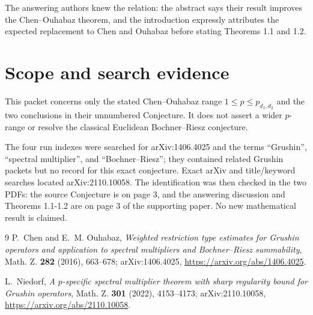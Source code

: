 \documentclass[11pt]{article}
\newcommand{\pd}{p_{d_1,d_2}}
\begin{document}
The answering authors knew the relation: the abstract says their result
improves the Chen--Ouhabaz theorem, and the introduction expressly attributes
the expected replacement to Chen and Ouhabaz before stating Theorems 1.1 and
1.2.

\section*{Scope and search evidence}

This packet concerns only the stated Chen--Ouhabaz range
$1\leq p\leq\pd$ and the two conclusions in their unnumbered Conjecture. It
does not assert a wider $p$-range or resolve the classical Euclidean
Bochner--Riesz conjecture.

The four run indexes were searched for arXiv:1406.4025 and the terms
``Grushin'', ``spectral multiplier'', and ``Bochner--Riesz''; they contained
related Grushin packets but no record for this exact conjecture. Exact arXiv
and title/keyword searches located arXiv:2110.10058. The identification was
then checked in the two PDFs: the source Conjecture is on page 3, and the
answering discussion and Theorems 1.1-1.2 are on page 3 of the supporting
paper. No new mathematical result is claimed.

\begin{thebibliography}{9}
P.~Chen and E.~M. Ouhabaz,
\emph{Weighted restriction type estimates for Grushin operators and
application to spectral multipliers and Bochner--Riesz summability},
Math. Z. \textbf{282} (2016), 663--678;
arXiv:1406.4025,
\url{https://arxiv.org/abs/1406.4025}.

L.~Niedorf,
\emph{A $p$-specific spectral multiplier theorem with sharp regularity bound
for Grushin operators},
Math. Z. \textbf{301} (2022), 4153--4173;
arXiv:2110.10058,
\url{https://arxiv.org/abs/2110.10058}.
\end{thebibliography}
\end{document}
